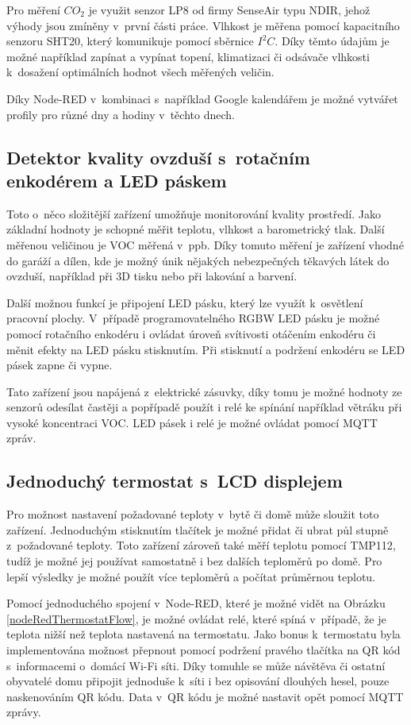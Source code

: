 Pro měření $CO_2$ je využit senzor LP8 od firmy SenseAir typu NDIR, jehož výhody jsou zmíněny v~první části práce.
Vlhkost je měřena pomocí kapacitního senzoru SHT20, který komunikuje pomocí sběrnice $I^2C$.
Díky těmto údajům je možné například zapínat a vypínat topení, klimatizaci či odsávače vlhkosti k~dosažení optimálních hodnot všech měřených veličin.

Díky Node-RED v~kombinaci s~například Google kalendářem je možné vytvářet profily pro různé dny a hodiny v~těchto dnech.

\subsection*{Detektor kvality ovzduší s~rotačním enkodérem a LED páskem}
Toto o~něco složitější zařízení umožňuje monitorování kvality prostředí. Jako základní hodnoty je schopné měřit teplotu, vlhkost a barometrický tlak. 
Další měřenou veličinou je VOC měřená v~ppb. Díky tomuto měření je zařízení vhodné do garáží a dílen, kde je možný únik nějakých nebezpečných těkavých látek do ovzduší, například při 3D tisku nebo při lakování a barvení.

Další možnou funkcí je připojení LED pásku, který lze využít k~osvětlení pracovní plochy. V~případě programovatelného RGBW LED pásku je možné pomocí rotačního enkodéru i ovládat úroveň svítivosti otáčením enkodéru či měnit efekty na LED pásku stisknutím. Při stisknutí a podržení enkodéru se LED pásek zapne či vypne.

Tato zařízení jsou napájená z~elektrické zásuvky, díky tomu je možné hodnoty ze senzorů odesílat častěji a popřípadě použít i relé ke spínání například větráku při vysoké koncentraci VOC.
LED pásek i relé je možné ovládat pomocí MQTT zpráv.

\subsection*{Jednoduchý termostat s~LCD displejem}
Pro možnost nastavení požadované teploty v~bytě či domě může sloužit toto zařízení. Jednoduchým stisknutím tlačítek je možné přidat či ubrat půl stupně z~požadované teploty. Toto zařízení zároveň také měří teplotu pomocí TMP112, tudíž je možné jej používat samostatně i bez dalších teploměrů po domě. 
Pro lepší výsledky je možné použít více teploměrů a počítat průměrnou teplotu.

Pomocí jednoduchého spojení v~Node-RED, které je možné vidět na Obrázku \ref{nodeRedThermostatFlow}, je možné ovládat relé, které spíná v~případě, že je teplota nižší než teplota nastavená na termostatu.
Jako bonus k~termostatu byla implementována možnost přepnout pomocí podržení pravého tlačítka na QR kód s~informacemi o~domácí Wi-Fi síti. Díky tomuhle se může návštěva či ostatní obyvatelé domu připojit jednoduše k~síti i bez opisování dlouhých hesel, pouze naskenováním QR kódu. Data v~QR kódu je možné nastavit opět pomocí MQTT zprávy.

